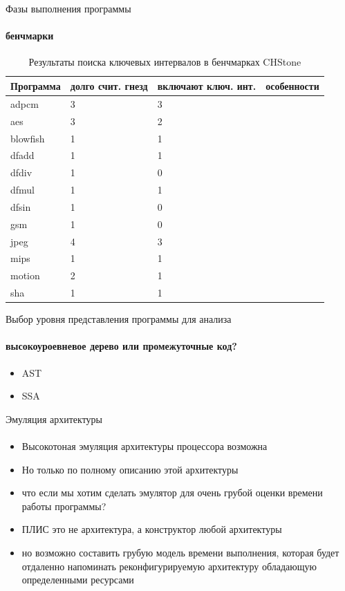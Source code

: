 \documentclass{beamer}              %
\begin{document}
\begin{frame}{Фазы выполнения программы}
  \framesubtitle{бенчмарки}
  \begin{table}
    \begin{tabular}{ | p{1.5cm} | p{2cm} | p{1cm} | p{6cm} |}
    \hline
    Программа & долго счит. гнезд & включают ключ. инт. & особенности \\ \hline
    adpcm & 3 & 3 &  \\ \hline
    aes & 3 & 2 &  \\ \hline
    blowfish & 1 & 1 &  \\ \hline
    dfadd & 1 & 1 &  \\ \hline
    dfdiv & 1 & 0 &  \\ \hline
    dfmul & 1 & 1 &  \\ \hline
    dfsin & 1 & 0 &  \\ \hline
    gsm & 1 & 0 &  \\ \hline
    jpeg & 4 & 3 & \\ \hline
    mips & 1 & 1 & \\ \hline
    motion & 2 & 1 &  \\ \hline
    sha & 1 & 1 &  \\ \hline
    \end{tabular} 
    \caption{Результаты поиска ключевых интервалов в бенчмарках CHStone}
    \label{table:CHStoneSimpoints}
\end{table}

\end{frame}

\begin{frame}{Выбор уровня представления программы для анализа}
  \framesubtitle{высокоуроевневое дерево или промежуточные код?}
  
  \begin{itemize}
      \item AST
      \item SSA
  \end{itemize}
  
\end{frame}

\begin{frame}{Эмуляция архитектуры}
  \framesubtitle{}
  
  \begin{itemize}
      \item Высокотоная эмуляция архитектуры процессора возможна
      \item Но только по полному описанию этой архитектуры
      \item что если мы хотим сделать эмулятор для очень грубой оценки времени работы программы?
      \item ПЛИС это не архитектура, а конструктор любой архитектуры
      \item но возможно составить грубую модель времени выполнения, которая будет отдаленно напоминать реконфигурируемую архитектуру обладающую определенными ресурсами
  \end{itemize}
  
\end{frame}
\end{document}
